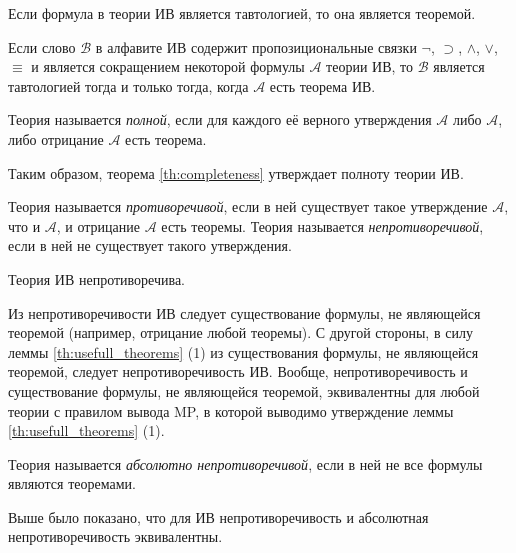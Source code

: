 \begin{theorem}\label{th:completeness}
    Если формула в теории ИВ является тавтологией, то она является теоремой.
\end{theorem}

\begin{corollary}
    Если слово $\mathcal{B}$ в алфавите ИВ содержит пропозициональные связки $\neg$, $\supset$, $\land$, $\lor$, $\equiv$ и является сокращением некоторой формулы $\mathcal{A}$ теории ИВ, то $\mathcal{B}$ является тавтологией тогда и только тогда, когда $\mathcal{A}$ есть теорема ИВ.
\end{corollary}

\begin{definition*}
    Теория называется \textit{полной}, если для каждого её верного утверждения $\mathcal{A}$ либо $\mathcal{A}$, либо отрицание $\mathcal{A}$ есть теорема.
\end{definition*}
Таким образом, теорема \ref{th:completeness} утверждает полноту теории ИВ.

\begin{definition*}
    Теория называется \textit{противоречивой}, если в ней существует такое утверждение $\mathcal{A}$, что и $\mathcal{A}$, и отрицание $\mathcal{A}$ есть теоремы. Теория называется \textit{непротиворечивой}, если в ней не существует такого утверждения.
\end{definition*}

\begin{corollary}
    Теория ИВ непротиворечива.
\end{corollary}
Из непротиворечивости ИВ следует существование формулы, не являющейся теоремой (например, отрицание любой теоремы). С другой стороны, в силу леммы \ref{th:usefull_theorems} (1) из существования формулы, не являющейся теоремой, следует непротиворечивость ИВ. Вообще, непротиворечивость и существование формулы, не являющейся теоремой, эквивалентны для любой теории с правилом вывода MP, в которой выводимо утверждение леммы \ref{th:usefull_theorems} (1).

\begin{definition*}
    Теория называется \textit{абсолютно непротиворечивой}, если в ней не все формулы являются теоремами.
\end{definition*}
Выше было показано, что для ИВ непротиворечивость и абсолютная непротиворечивость эквивалентны.
